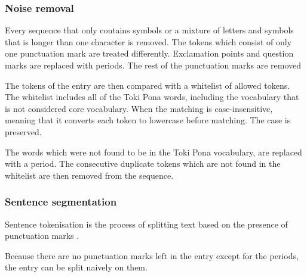 \documentclass[14pt, a4paper]{extreport}
\begin{document}
%
      \subsubsection{Noise removal}
Every sequence that only contains symbols or a mixture of letters and symbols that is longer than one character is removed. The tokens which consist of only one punctuation mark are treated differently. Exclamation points and question marks are replaced with periods. The rest of the punctuation marks are removed

The tokens of the entry are then compared with a whitelist of allowed tokens. The whitelist includes all of the Toki Pona words, including the vocabulary that is not considered core vocabulary. When the matching is case-insensitive, meaning that it converts each token to lowercase before matching. The case is preserved.

The words which were not found to be in the Toki Pona vocabulary, are replaced with a period. The consecutive duplicate tokens which are not found in the whitelist are then removed from the sequence.

%
      \subsubsection{Sentence segmentation}
Sentence tokenisation is the process of splitting text based on the presence of punctuation marks \parencite[51]{vajjala}.

Because there are no punctuation marks left in the entry except for the periods, the entry can be split naively on them.
\end{document}
